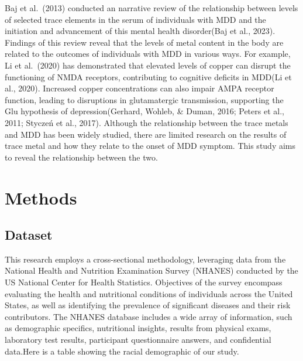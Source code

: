 \documentclass[
  man,floatsintext]{apa6}
\begin{document}
Baj et al.~(2013) conducted an narrative review of the relationship between levels of selected trace elements in the serum of individuals with MDD and the initiation and advancement of this mental health disorder(Baj et al., 2023). Findings of this review reveal that the levels of metal content in the body are related to the outcomes of individuals with MDD in various ways. For example, Li et al.~(2020) has demonstrated that elevated levels of copper can disrupt the functioning of NMDA receptors, contributing to cognitive deficits in MDD(Li et al., 2020). Increased copper concentrations can also impair AMPA receptor function, leading to disruptions in glutamatergic transmission, supporting the Glu hypothesis of depression(Gerhard, Wohleb, \& Duman, 2016; Peters et al., 2011; Styczeń et al., 2017).
Although the relationship between the trace metals and MDD has been widely studied, there are limited research on the results of trace metal and how they relate to the onset of MDD symptom. This study aims to reveal the relationship between the two.

\hypertarget{methods}{%
\section{Methods}\label{methods}}

\hypertarget{dataset}{%
\subsection{Dataset}\label{dataset}}

This research employs a cross-sectional methodology, leveraging data from the National Health and Nutrition Examination Survey (NHANES) conducted by the US National Center for Health Statistics. Objectives of the survey encompass evaluating the health and nutritional conditions of individuals across the United States, as well as identifying the prevalence of significant diseases and their risk contributors. The NHANES database includes a wide array of information, such as demographic specifics, nutritional insights, results from physical exams, laboratory test results, participant questionnaire answers, and confidential data.Here is a table showing the racial demographic of our study.

\begin{table}
\centering
\caption{\label{tab:racial-demographic}Racial Demographics}
\centering
{}
\end{table}
\end{document}
